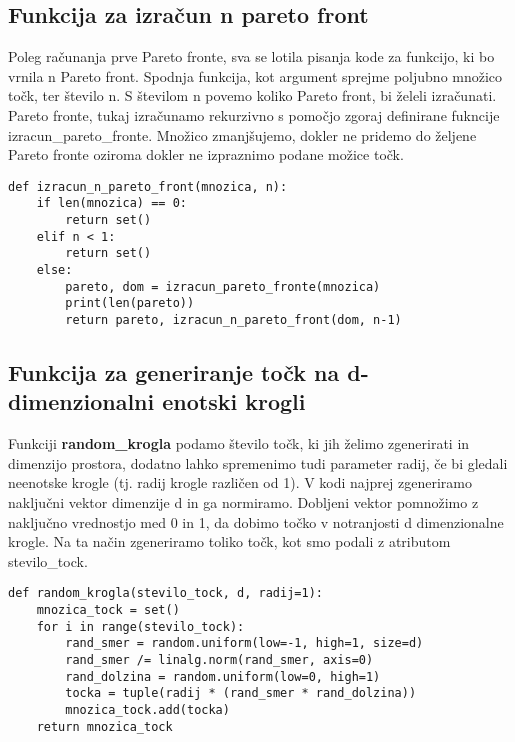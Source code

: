 \documentclass{article}
\begin{document}
\subsection{Funkcija za izračun n pareto front}
Poleg računanja prve Pareto fronte, sva se lotila pisanja kode za funkcijo, ki bo vrnila n Pareto front. Spodnja funkcija, kot argument sprejme poljubno množico točk, ter število n. S številom n povemo koliko Pareto front, bi želeli izračunati. Pareto fronte, tukaj izračunamo rekurzivno s pomočjo zgoraj definirane fukncije izracun\_pareto\_fronte. Množico zmanjšujemo, dokler ne pridemo do željene Pareto fronte oziroma dokler ne izpraznimo podane možice točk.

\begin{verbatim}
def izracun_n_pareto_front(mnozica, n): 
    if len(mnozica) == 0:   
        return set()
    elif n < 1:
        return set()    
    else:
        pareto, dom = izracun_pareto_fronte(mnozica)
        print(len(pareto))  
        return pareto, izracun_n_pareto_front(dom, n-1)
\end{verbatim}

\subsection{Funkcija za generiranje točk na d-dimenzionalni enotski krogli}
Funkciji \textbf{random\_krogla} podamo število točk, ki jih želimo zgenerirati in dimenzijo prostora, dodatno lahko spremenimo tudi parameter radij, če bi gledali neenotske krogle (tj. radij krogle različen od 1). V kodi najprej zgeneriramo naključni vektor dimenzije d in ga normiramo. Dobljeni vektor pomnožimo z naključno vrednostjo med 0 in 1, da dobimo točko v notranjosti d dimenzionalne krogle. Na ta način zgeneriramo toliko točk, kot smo podali z atributom stevilo\_tock.
\begin{verbatim}
def random_krogla(stevilo_tock, d, radij=1):
    mnozica_tock = set()
    for i in range(stevilo_tock):    
        rand_smer = random.uniform(low=-1, high=1, size=d) 
        rand_smer /= linalg.norm(rand_smer, axis=0) 
        rand_dolzina = random.uniform(low=0, high=1) 
        tocka = tuple(radij * (rand_smer * rand_dolzina)) 
        mnozica_tock.add(tocka)
    return mnozica_tock
\end{verbatim}
\end{document}
